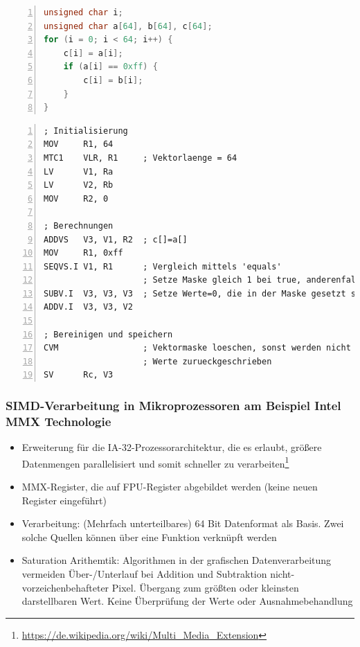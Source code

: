 \begin{itemize}
\begin{minipage}{\linewidth}
		\begin{lstlisting}[frame=single,numbers=left,mathescape,language=C,tabsize=4]
unsigned char i;
unsigned char a[64], b[64], c[64];
for (i = 0; i < 64; i++) {
	c[i] = a[i];
	if (a[i] == 0xff) {
		c[i] = b[i];
	}
}
		\end{lstlisting}
		\end{minipage}
		\begin{minipage}{\linewidth}
		\begin{lstlisting}[frame=single,numbers=left,mathescape,language={[mips]Assembler},tabsize=4]
; Initialisierung
MOV 	R1, 64
MTC1	VLR, R1		; Vektorlaenge = 64
LV 		V1, Ra
LV 		V2, Rb
MOV 	R2, 0

; Berechnungen
ADDVS 	V3, V1, R2 	; c[]=a[]
MOV 	R1, 0xff
SEQVS.I	V1, R1		; Vergleich mittels 'equals'
					; Setze Maske gleich 1 bei true, anderenfalls 0
SUBV.I 	V3, V3, V3  ; Setze Werte=0, die in der Maske gesetzt sind
ADDV.I 	V3, V3, V2

; Bereinigen und speichern
CVM					; Vektormaske loeschen, sonst werden nicht alle
					; Werte zurueckgeschrieben
SV 		Rc, V3
		\end{lstlisting}
		\end{minipage}
\end{itemize}

\subsubsection{SIMD-Verarbeitung in Mikroprozessoren am Beispiel Intel MMX Technologie}
\begin{itemize}
	\item Erweiterung für die IA-32-Prozessorarchitektur, die es erlaubt, größere Datenmengen parallelisiert und somit schneller zu verarbeiten\footnote{\url{https://de.wikipedia.org/wiki/Multi_Media_Extension}}
	\item MMX-Register, die auf FPU-Register abgebildet werden (keine neuen Register eingeführt)
	\item Verarbeitung: (Mehrfach unterteilbares) 64 Bit Datenformat als Basis. Zwei solche Quellen können über eine Funktion verknüpft werden
	\item Saturation Arithemtik: Algorithmen in der grafischen Datenverarbeitung vermeiden Über-/Unterlauf bei Addition und Subtraktion nicht-vorzeichenbehafteter Pixel. Übergang zum größten oder kleinsten darstellbaren Wert. Keine Überprüfung der Werte oder Ausnahmebehandlung
\end{itemize}




